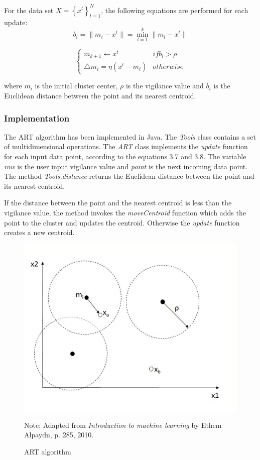\documentclass{lmproj}
\begin{document}
For the data set $X = \left\{ {x^{t}}\right\}_{t=1}^N$, the following equations are performed for each update:
\begin{equation}
b_{i} = \parallel{m_{i}} - x^{t}\parallel  = \min_{l=1}^k \parallel  m_{l} - x^{t}∥
\end{equation}
 
\begin{equation}
\begin{cases}
m_{k+1}\leftarrow x^{t} & if b_{i}>\rho
\\\triangle{m_{i}}=\eta\left(x^{t} - m_{i}\right) & otherwise
\end{cases}
\end{equation}

where $m_{i}$ is the initial cluster center, $\rho$ is the vigilance value and $b_{i}$ is the  Euclidean distance between the point and its nearest centroid. 


\subsubsection{Implementation}
The ART algorithm has been implemented in Java. The \textit{Tools} class contains a set of multidimensional operations. The \textit{ART} class implements the \textit{update} function for each input data point, according to the equations 3.7 and 3.8. The variable \textit{row} is the user input vigilance value and \textit{point} is the next incoming data point. The method \textit{Tools.distance} returns the  Euclidean distance between the point and its nearest centroid.



If the distance between the point and the nearest centroid is less than the vigilance value, the method invokes the \textit{moveCentroid} function which adds the point to the cluster and updates the centroid. Otherwise the \textit{update} function creates a new centroid.



\begin{figure}[ht]
	\centering
	\includegraphics[width=0.8\linewidth]{artpic.png}
   \caption[ART]{ART algorithm}
    \footnotesize{Note: Adapted from \textit{Introduction to machine learning} by Ethem Alpaydn, p. 285, 2010. \cite{Clustering}}
 \end{figure}
\end{document}
